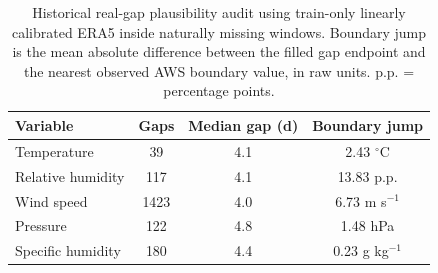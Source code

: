 \begin{table}[t]
  \centering
  \caption{Historical real-gap plausibility audit using train-only linearly calibrated ERA5 inside naturally missing windows. Boundary jump is the mean absolute difference between the filled gap endpoint and the nearest observed AWS boundary value, in raw units. p.p. = percentage points.}
  \label{tab:real-gap-plausibility}
  \begin{tabular}{lccc}
    \toprule
    Variable & Gaps & Median gap (d) & Boundary jump \\
    \midrule
    Temperature & 39 & 4.1 & 2.43 $^\circ$C \\
    Relative humidity & 117 & 4.1 & 13.83 p.p. \\
    Wind speed & 1423 & 4.0 & 6.73 m s$^{-1}$ \\
    Pressure & 122 & 4.8 & 1.48 hPa \\
    Specific humidity & 180 & 4.4 & 0.23 g kg$^{-1}$ \\
    \bottomrule
  \end{tabular}
\end{table}
